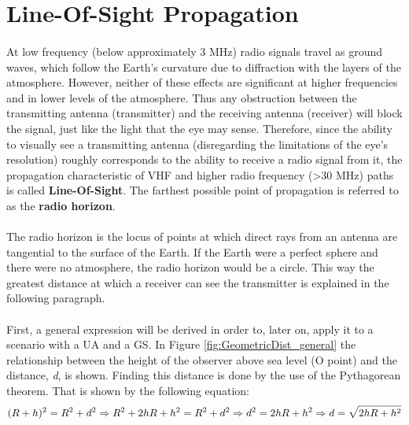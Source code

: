 \section{Line-Of-Sight Propagation}\label{subsec:los_propagation}
\paragraph{}At low frequency (below approximately 3 MHz) radio signals travel as ground waves, which follow the Earth's curvature due to diffraction with the layers of the atmosphere.
However, neither of these effects are significant at higher frequencies and in lower levels of the atmosphere. Thus any obstruction between the transmitting antenna (transmitter) and the receiving antenna (receiver) will block the signal, just like the light that the eye may sense. Therefore, since the ability to visually see a transmitting antenna (disregarding the limitations of the eye's resolution) roughly corresponds to the ability to receive a radio signal from it, the propagation characteristic of VHF and higher radio frequency (>30 MHz) paths is called \textbf{Line-Of-Sight}. The farthest possible point of propagation is referred to as the \textbf{radio horizon}.

\paragraph{}The radio horizon is the locus of points at which direct rays from an antenna are tangential to the surface of the Earth. If the Earth were a perfect sphere and there were no atmosphere, the radio horizon would be a circle.
This way the greatest distance at which a receiver can see the transmitter is explained in the following paragraph.

\paragraph{}First, a general expression will be derived in order to, later on, apply it to a scenario with a UA and a GS. In Figure \ref{fig:GeometricDist_general} the relationship between the height of the observer above sea level (O point) and the distance, \textit{d}, is shown. Finding this distance is done by the use of the Pythagorean theorem. That is shown by the following equation:
\begin{equation}\label{eq:los_distToHorizon}
	(R+h)^2 = R^2+d^2\nonumber \\
	\Rightarrow R^2+2hR+h^2 = R^2+d^2 \Rightarrow d^2 = 2hR + h^2 \\
	\Rightarrow d = \sqrt{2hR + h^2}
\end{equation} 

